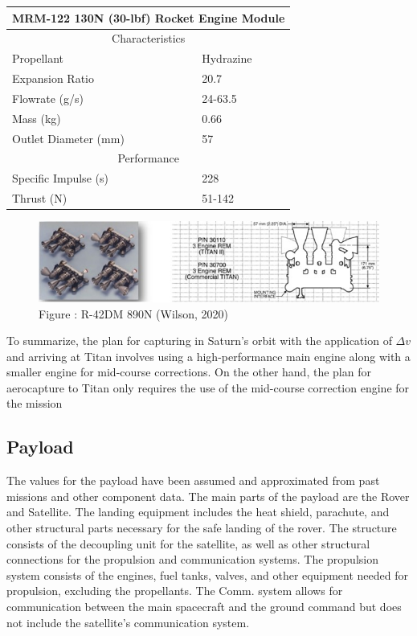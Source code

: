 \documentclass[conf]{new-aiaa}
\begin{document}
{\centering
\begin{tabular}{ |p{4cm}||p{4cm}|  }
\hline
\multicolumn{2}{|c|}{MRM-122 130N (30-lbf) Rocket Engine Module\cite{wilson_2020}}\\
 \hline
 \multicolumn{2}{|c|}{Characteristics} \\
 \hline
 Propellant&Hydrazine\\
 \hline
 Expansion Ratio&20.7\\
 \hline
 Flowrate (g/s)&24-63.5\\
 \hline
 Mass (kg)&0.66\\
 \hline
 Outlet Diameter (mm)&57\\
 \hline
 \multicolumn{2}{|c|}{Performance} \\
 \hline
 Specific Impulse (s)&228\\
 \hline
 Thrust (N)&51-142\\
 \hline

\end{tabular}
\par}
\begin{figure}[h!]
    \centering
    \includegraphics{Kims Pic 2.jpg}
    \caption{Figure : R-42DM 890N (Wilson, 2020)}
    \label{fig:my_label}
\end{figure}

\par To summarize, the plan for capturing in Saturn's orbit with the application of $\Delta v$ and arriving at Titan involves using a high-performance main engine along with a smaller engine for mid-course corrections. On the other hand, the plan for aerocapture to Titan only requires the use of the mid-course correction engine for the mission

\subsection{Payload}
\par The values for the payload have been assumed and approximated from past missions and other component data. The main parts of the payload are the Rover and Satellite. The landing equipment includes the heat shield, parachute, and other structural parts necessary for the safe landing of the rover. The structure consists of the decoupling unit for the satellite, as well as other structural connections for the propulsion and communication systems. The propulsion system consists of the engines, fuel tanks, valves, and other equipment needed for propulsion, excluding the propellants. The Comm. system allows for communication between the main spacecraft and the ground command but does not include the satellite's communication system.\\
\end{document}
